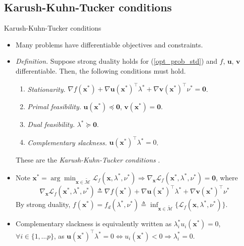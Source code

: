 \documentclass{beamer}
\numberwithin{equation}{section}
\newcommand{\aref}[1]{\alert{\ref{#1}}}
\begin{document}
\subsection{Karush-Kuhn-Tucker conditions}

\begin{frame}{Karush-Kuhn-Tucker conditions}
    \begin{itemize}
        \item
        Many problems have differentiable objectives and constraints.

        \item
        \textit{Definition.} Suppose strong duality holds for
        (\aref{opt_prob_std}) and $ f $, $ \mathbf{u} $, $ \mathbf{v} $
        differentiable. Then, the following conditions must hold.
        \begin{enumerate}
            \item
            \textit{Stationarity.} $ \nabla f(\mathbf{x}^*) +
            \nabla\mathbf{u}(\mathbf{x}^*)^\top\lambda^* +
            \nabla\mathbf{v}(\mathbf{x}^*)^\top\nu^* = \mathbf{0} $.

            \item
            \textit{Primal feasibility.} $ \mathbf{u}(\mathbf{x}^*) \preceq
            \mathbf{0} $, $ \mathbf{v}(\mathbf{x}^*) = \mathbf{0} $.

            \item
            \textit{Dual feasibility.} $ \lambda^* \succeq \mathbf{0} $.

            \item
            \textit{Complementary slackness.} $ \mathbf{u}(\mathbf{x}^*)^\top
            \lambda^* = 0 $.
        \end{enumerate}
        These are the \textit{Karush-Kuhn-Tucker conditions}
        \cite{bv_convex_opt}.

        \item
        Note $ \mathbf{x}^* =
        \arg\min_{\mathbf{x} \in \tilde{\mathcal{M}}}
        \mathcal{L}_f(\mathbf{x}, \lambda^*, \nu^*) \Rightarrow
        \nabla_\mathbf{x}\mathcal{L}_f(\mathbf{x}^*, \lambda^*, \nu^*) =
        \mathbf{0} $, where
        \begin{equation*}
            \nabla_\mathbf{x}\mathcal{L}_f(\mathbf{x}^*, \lambda^*, \nu^*)
            \triangleq  \nabla f(\mathbf{x}^*) +
            \nabla\mathbf{u}(\mathbf{x}^*)^\top\lambda^* +
            \nabla\mathbf{v}(\mathbf{x}^*)^\top\nu^*
        \end{equation*}
        By strong duality, $ f(\mathbf{x}^*) = f_d(\lambda^*, \nu^*)
        \triangleq \inf_{\mathbf{x} \in \tilde{\mathcal{M}}}\{
            \mathcal{L}_f(\mathbf{x}, \lambda^*, \nu^*)
        \} $.

        \item
        Complementary slackness is equivalently written as
        $ \lambda_i^*u_i(\mathbf{x}^*) = 0 $,
        $ \forall i \in \{1, \ldots p\} $, as 
        $ \mathbf{u}(\mathbf{x}^*)^\top\lambda^* = 0 \Leftrightarrow
        u_i(\mathbf{x}^*) < 0 \Rightarrow \lambda_i^* = 0 $.
    \end{itemize}
\end{frame}
\end{document}
